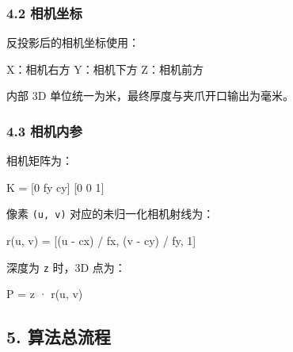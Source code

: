 \documentclass[
  chinese,
  11pt,
  a4paper,
]{article}
\newenvironment{Shaded}{\begin{snugshade}}{\end{snugshade}}
\newcommand{\NormalTok}[1]{#1}
\begin{document}
\subsubsection{4.2 相机坐标}\label{42-ux76f8ux673aux5750ux6807}

反投影后的相机坐标使用：

\begin{Shaded}
\begin{Highlighting}[]
\NormalTok{X：相机右方}
\NormalTok{Y：相机下方}
\NormalTok{Z：相机前方}
\end{Highlighting}
\end{Shaded}

内部 3D 单位统一为米，最终厚度与夹爪开口输出为毫米。

\subsubsection{4.3 相机内参}\label{43-ux76f8ux673aux5185ux53c2}

相机矩阵为：

\begin{Shaded}
\begin{Highlighting}[]
\NormalTok{    [fx  0  cx]}
\NormalTok{K = [0  fy  cy]}
\NormalTok{    [0   0   1]}
\end{Highlighting}
\end{Shaded}

像素 \texttt{(u,\ v)} 对应的未归一化相机射线为：

\begin{Shaded}
\begin{Highlighting}[]
\NormalTok{r(u, v) = [(u {-} cx) / fx, (v {-} cy) / fy, 1]}
\end{Highlighting}
\end{Shaded}

深度为 \texttt{z} 时，3D 点为：

\begin{Shaded}
\begin{Highlighting}[]
\NormalTok{P = z · r(u, v)}
\end{Highlighting}
\end{Shaded}

\subsection{5. 算法总流程}\label{5-ux7b97ux6cd5ux603bux6d41ux7a0b}
\end{document}
